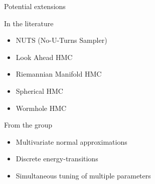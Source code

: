 \documentclass{beamer}
\begin{document}

    \begin{frame}{Potential extensions}

    \begin{block}{In the literature}
        \begin{itemize}
            \item NUTS (No-U-Turns Sampler)
            \item Look Ahead HMC
            \item Riemannian Manifold HMC
            \item Spherical HMC
            \item Wormhole HMC
        \end{itemize}
    \end{block}

    \begin{block}{From the group}
        \begin{itemize}
            \item Multivariate normal approximations
            \item Discrete energy-transitions
            \item Simultaneous tuning of multiple parameters
        \end{itemize}
    \end{block}

    \end{frame}
\end{document}
